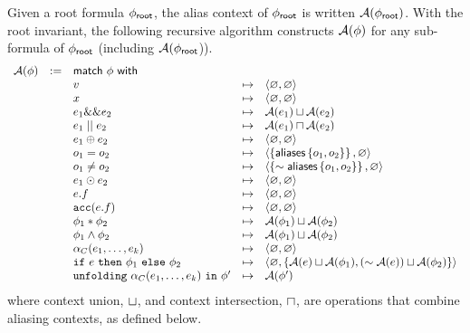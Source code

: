 Given a root formula $\phi_\textsf{root}$, the alias context of $\phi_\textsf{root}$ is written $\mathcal{A}(\phi_\textsf{root})$. With the root invariant, the following recursive algorithm constructs $\mathcal{A}(\phi)$ for any sub-formula of $\phi_\textsf{root}$ (including $\mathcal{A}(\phi_\textsf{root}$)).
%
\begin{align*}
\begin{array}{rclcl}
\A(\phi) &:=& \tsf{match} \ \phi \ \tsf{with} \\
&& v &\mt&
  \ctx{\empty}{\empty}
\\
&& x &\mt&
  \ctx{\empty}{\empty}
\\
&& e_1 \band e_2 &\mt&
  \A(e_1) \contextunion \A(e_2)
\\
&& e_1 \bor e_2 &\mt&
  \A(e_1) \contextintersection \A(e_2)
\\
&& e_1 \oplus e_2 &\mt&
  \ctx{\empty}{\empty}
\\
&& o_1 = o_2 &\mt&
  \ctx{\set{\aliases\set{o_1, o_2}}}{\empty} %
\\
&& o_1 \neq o_2 &\mt&
  \ctx{\set{\pnot \aliases\set{o_1, o_2}}}{\empty}
\\
&& e_1 \odot e_2 &\mt&
  \ctx{\empty}{\empty}
\\
&& e.f &\mt&
  \ctx{\empty}{\empty}
\\
&& \cacc(e.f) &\mt&
  \ctx{\empty}{\empty}
\\
&& \phi_1 \ast \phi_2 &\mt&
  \A(\phi_1) \contextunion \A(\phi_2)
\\
&& \phi_1 \land \phi_2 &\mt&
  \A(\phi_1) \contextunion \A(\phi_2)
\\
&& \alpha_C(e_1, \dots, e_k) &\mt&
  \ctx{\empty}{\empty}
\\
&& \cif \ e \ \cthen \ \phi_1 \ \celse \ \phi_2 &\mt&
  \ctx{\empty}{\set{ \A(e) \contextunion \A(\phi_1), (\pnot \A(e)) \contextunion \A(\phi_2) }}
\\
&& \cunfolding \ \alpha_C(e_1, \dots, e_k) \ \cin \ \phi\p &\mt&
  \A(\phi\p)
\end{array}
\end{align*}
%
where context union, $\sqcup$, and context intersection, $\sqcap$, are operations that combine aliasing contexts, as defined below.
%
